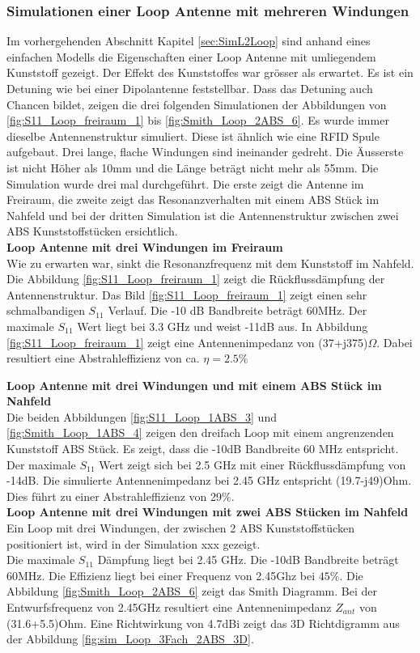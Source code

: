 \subsubsection{Simulationen einer Loop Antenne mit mehreren Windungen}
Im vorhergehenden Abschnitt Kapitel \ref{sec:SimL2Loop} sind anhand eines einfachen Modells die Eigenschaften einer Loop Antenne mit umliegendem Kunststoff gezeigt. Der Effekt des Kunststoffes war grösser als erwartet. Es ist ein Detuning wie bei einer Dipolantenne feststellbar. Dass das Detuning auch Chancen bildet, zeigen die drei folgenden Simulationen der Abbildungen von \ref{fig:S11_Loop_freiraum_1} bis \ref{fig:Smith_Loop_2ABS_6}. Es wurde immer dieselbe Antennenstruktur simuliert. Diese ist ähnlich wie eine RFID Spule aufgebaut. Drei lange, flache Windungen sind ineinander gedreht. Die Äusserste ist nicht Höher als 10mm und die Länge beträgt nicht mehr als 55mm. Die Simulation wurde drei mal durchgeführt. Die erste zeigt die Antenne im Freiraum, die zweite zeigt das Resonanzverhalten mit einem ABS Stück im Nahfeld und bei der dritten Simulation ist die Antennenstruktur zwischen zwei ABS Kunststoffstücken ersichtlich.\\

\textbf{Loop Antenne mit drei Windungen im Freiraum}\\
Wie zu erwarten war, sinkt die Resonanzfrequenz mit dem Kunststoff im Nahfeld. Die Abbildung \ref{fig:S11_Loop_freiraum_1} zeigt die Rückflussdämpfung der Antennenstruktur. Das Bild \ref{fig:S11_Loop_freiraum_1} zeigt einen sehr schmalbandigen $S_{11}$ Verlauf. Die -10 dB Bandbreite beträgt 60MHz. Der maximale $S_{11}$ Wert liegt bei 3.3 GHz und weist -11dB aus. In Abbildung \ref{fig:S11_Loop_freiraum_1} zeigt eine Antennenimpedanz von (37+j375)$\Omega$. Dabei resultiert eine Abstrahleffizienz von ca. $\eta=2.5\%$


\textbf{Loop Antenne mit drei Windungen und mit einem ABS Stück im Nahfeld}\\
Die beiden Abbildungen \ref{fig:S11_Loop_1ABS_3} und \ref{fig:Smith_Loop_1ABS_4} zeigen den dreifach Loop mit einem angrenzenden Kunststoff ABS Stück. Es zeigt, dass die -10dB Bandbreite 60 MHz entspricht. Der maximale $S_{11}$ Wert zeigt sich bei 2.5 GHz mit einer Rückflussdämpfung von -14dB. Die simulierte Antennenimpedanz bei 2.45 GHz entspricht (19.7-j49)Ohm. Dies führt zu einer Abstrahleffizienz von 29$\%$.\\

\textbf{Loop Antenne mit drei Windungen mit zwei ABS Stücken im Nahfeld}\\
Ein Loop mit drei Windungen, der zwischen 2 ABS Kunststoffstücken positioniert ist, wird in der Simulation xxx gezeigt.
\\
Die maximale $S_{11}$ Dämpfung liegt bei 2.45 GHz. Die -10dB Bandbreite beträgt 60MHz. Die Effizienz liegt bei einer Frequenz von 2.45Ghz bei $45\%$. Die Abbildung \ref{fig:Smith_Loop_2ABS_6} zeigt das Smith Diagramm. Bei der Entwurfsfrequenz von 2.45GHz resultiert eine Antennenimpedanz $Z_{ant}$ von (31.6+5.5)Ohm.
Eine Richtwirkung von 4.7dBi zeigt das 3D Richtdigramm aus der Abbildung \ref{fig:sim_Loop_3Fach_2ABS_3D}.


